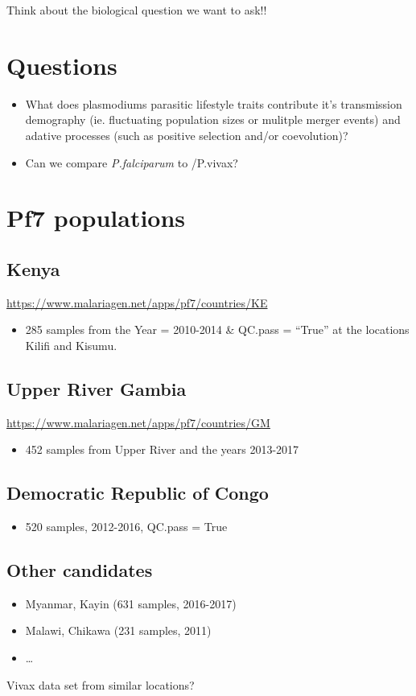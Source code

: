 \documentclass[11pt]{article}
\begin{document}
Think about the biological question we want to ask!!

\section{Questions}
\label{sec:org8a3f90f}
\begin{itemize}
\item What does plasmodiums parasitic lifestyle traits contribute it's transmission demography (ie. fluctuating population sizes or mulitple merger events) and adative processes (such as  positive selection and/or coevolution)?
\item Can we compare \emph{P.falciparum} to /P.vivax?
\end{itemize}

\section{Pf7 populations}
\label{sec:orgf1379e4}
\subsection{Kenya}
\label{sec:org1888425}
\url{https://www.malariagen.net/apps/pf7/countries/KE}
\begin{itemize}
\item 285 samples from the Year = 2010-2014 \& QC.pass = ``True'' at the locations Kilifi and Kisumu.
\end{itemize}

\subsection{Upper River Gambia}
\label{sec:org7007c7e}
\url{https://www.malariagen.net/apps/pf7/countries/GM}
\begin{itemize}
\item 452 samples from Upper River and the years 2013-2017
\end{itemize}

\subsection{Democratic Republic of Congo}
\label{sec:orgbe92b72}
\begin{itemize}
\item 520 samples, 2012-2016, QC.pass = True
\end{itemize}

\subsection{Other candidates}
\label{sec:org839d17e}
\begin{itemize}
\item Myanmar, Kayin (631 samples, 2016-2017)
\item Malawi, Chikawa (231 samples, 2011)
\item \ldots{}
\end{itemize}
Vivax data set from similar locations?
\end{document}
